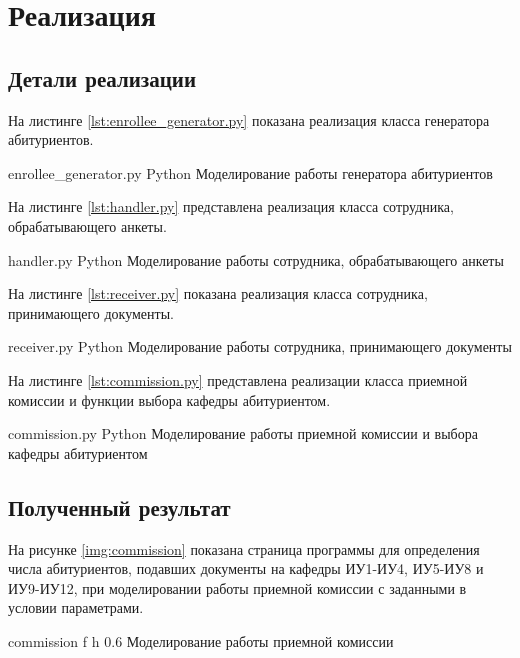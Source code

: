 \chapter{Реализация}

\section{Детали реализации}

На листинге \ref{lst:enrollee_generator.py} показана реализация класса генератора абитуриентов.

    {enrollee_generator.py}
    {Python}
    {Моделирование работы генератора абитуриентов}
\newpage

На листинге \ref{lst:handler.py} представлена реализация класса сотрудника, обрабатывающего анкеты.

    {handler.py}
    {Python}
    {Моделирование работы сотрудника, обрабатывающего анкеты}
    
На листинге \ref{lst:receiver.py} показана реализация класса сотрудника, принимающего документы.

    {receiver.py}
    {Python}
    {Моделирование работы сотрудника, принимающего документы}

На листинге \ref{lst:commission.py} представлена реализации класса приемной комиссии и функции выбора кафедры абитуриентом.

    {commission.py}
    {Python}
    {Моделирование работы приемной комиссии и выбора кафедры абитуриентом}

\section{Полученный результат}

На рисунке \ref{img:commission} показана страница программы для определения числа абитуриентов, подавших документы на кафедры ИУ1-ИУ4, ИУ5-ИУ8 и ИУ9-ИУ12, при моделировании работы приемной комиссии с заданными в условии параметрами.

    {commission}
    {f}
    {h}
    {0.6\textwidth}
    {Моделирование работы приемной комиссии}


